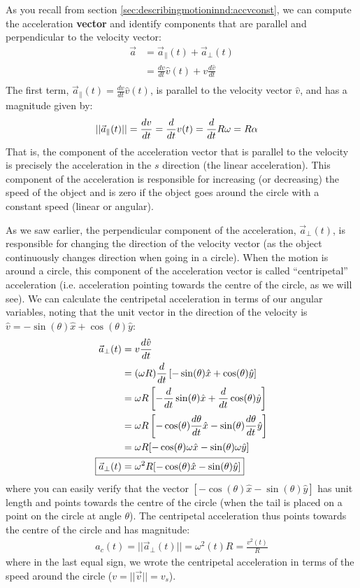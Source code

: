 As you recall from section \ref{sec:describingmotioninnd:accvconst}, we can compute the acceleration \textbf{vector} and identify components that are parallel and perpendicular to the velocity vector:
\begin{align*}
\vec a&=\vec a_{\parallel}(t) + \vec a_{\bot}(t)\\
&=\frac{dv}{dt}\hat v(t)+v\frac{d\hat v}{dt}\\
\end{align*}
The first term, $\vec a_{\parallel}(t)=\frac{dv}{dt}\hat v(t)$, is parallel to the velocity vector $\hat v$, and has a magnitude given by:
\begin{align*}
||\vec a_{\parallel}(t)||&=\frac{dv}{dt}=\frac{d}{dt} v(t)=\frac{d}{dt} R\omega=R\alpha
\end{align*}
That is, the component of the acceleration vector that is parallel to the velocity is precisely the acceleration in the $s$ direction (the linear acceleration). This component of the acceleration is responsible for increasing (or decreasing) the speed of the object and is zero if the object goes around the circle with a constant speed (linear or angular). 

As we saw earlier, the perpendicular component of the acceleration, $\vec a_{\bot}(t)$, is responsible for changing the direction of the velocity vector (as the object continuously changes direction when going in a circle). When the motion is around a circle, this component of the acceleration vector is called ``centripetal'' acceleration (i.e. acceleration pointing towards the centre of the circle, as we will see). We can calculate the centripetal acceleration in terms of our angular variables, noting that the unit vector in the direction of the velocity is $\hat v=-\sin(\theta)\hat x+\cos(\theta)\hat y$:
\begin{align}
\vec a_{\bot}(t)&=v\frac{d\hat v}{dt}\nonumber\\
&=(\omega R)\ddt \left[-\sin(\theta)\hat x+\cos(\theta)\hat y\right]\nonumber\\
&=\omega R \left[-\ddt\sin(\theta)\hat x+\ddt\cos(\theta)\hat y\right]\nonumber\\
&=\omega R \left[-\cos(\theta)\frac{d\theta}{dt}\hat x-\sin(\theta)\frac{d\theta}{dt}\hat y\right]\nonumber\\
&=\omega R [-\cos(\theta)\omega\hat x-\sin(\theta)\omega\hat y]\nonumber\\
\Aboxed{\vec a_{\bot}(t)&=\omega^2 R[-\cos(\theta)\hat x-\sin(\theta)\hat y]}
\end{align}
where you can easily verify that the vector $[-\cos(\theta)\hat x-\sin(\theta)\hat y]$ has unit length and points towards the centre of the circle (when the tail is placed on a point on the circle at angle $\theta$). The centripetal acceleration thus points towards the centre of the circle and has magnitude:
\begin{align}
a_c(t) = ||\vec a_{\bot}(t)||=\omega^2(t) R = \frac{v^2(t)}{R}
\end{align}
where in the last equal sign, we wrote the centripetal acceleration in terms of the speed around the circle ($v=||\vec v||=v_s$).

